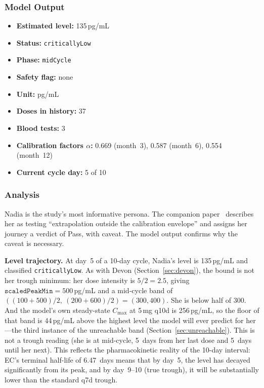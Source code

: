 \documentclass[11pt,a4paper]{article}
\newcommand{\good}[1]{#1}
\newcommand{\code}[1]{\texttt{\small #1}}
\begin{document}
\subsubsection{Model Output}

\begin{itemize}[nosep,leftmargin=1.4em]
\item \textbf{Estimated level:} 135\,pg/mL
\item \textbf{Status:} \code{criticallyLow}
\item \textbf{Phase:} \code{midCycle}
\item \textbf{Safety flag:} none
\item \textbf{Unit:} pg/mL
\item \textbf{Doses in history:} 37
\item \textbf{Blood tests:} 3
\item \textbf{Calibration factors $\alpha$:} 0.669 (month~3), 0.587
  (month~6), 0.554 (month~12)
\item \textbf{Current cycle day:} 5 of 10
\end{itemize}

\subsubsection{Analysis}

Nadia is the study's most informative persona. The companion
paper~\cite{xtux} describes her as testing ``extrapolation outside the
calibration envelope'' and assigns her journey a verdict of \good{Pass, with
caveat.} The model output confirms why the caveat is necessary.

\textbf{Level trajectory.} At day~5 of a 10-day cycle, Nadia's level is
135\,pg/mL and classified \code{criticallyLow}. As with Devon
(Section~\ref{sec:devon}), the bound is not her trough minimum: her dose
intensity is $5/2 = 2.5$, giving $\texttt{scaledPeakMin} = 500$\,pg/mL and
a mid-cycle band of $((100+500)/2,\ (200+600)/2) = (300, 400)$. She is below
half of 300. And the model's own steady-state $C_{\max}$ at 5\,mg q10d is
256\,pg/mL, so the floor of that band is 44\,pg/mL above the highest level
the model will ever predict for her---the third instance of the unreachable
band (Section~\ref{sec:unreachable}). This is not a trough reading (she is
at mid-cycle, 5~days from her last dose and 5~days until her next). This reflects the pharmacokinetic reality of the 10-day
interval: EC's terminal half-life of 6.47~days means that by day~5, the
level has decayed significantly from its peak, and by day~9--10 (true
trough), it will be substantially lower than the standard q7d trough.
\end{document}
